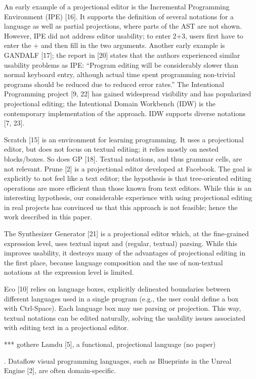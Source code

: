 An early example of a projectional editor is the Incremental Programming Environment (IPE) [16].
It supports the definition of several notations for a language as well as partial projections, where parts of the AST are not shown.
However, IPE did not address editor usability; to enter 2+3, users first have to enter the + and then fill in the two arguments.
Another early example is GANDALF [17]; the report in [20] states that the authors experienced similar usability problems as IPE: “Program editing will be considerably slower than normal keyboard entry, although actual time spent programming non-trivial programs should be reduced due to reduced error rates.”
The Intentional Programming project [9, 22] has gained widespread visibility and has popularized projectional editing; the Intentional Domain Workbench (IDW) is the contemporary implementation of the approach.
IDW supports diverse notations [7, 23].

Scratch [15] is an environment for learning programming.
It uses a projectional editor, but does not focus on textual editing; it relies mostly on nested blocks/boxes.
So does GP [18].
Textual notations, and thus grammar cells, are not relevant.
Prune [2] is a projectional editor developed at Facebook.
The goal is explicitly to not feel like a text editor; the hypothesis is that tree-oriented editing operations are more efficient than those known from text editors.
While this is an interesting hypothesis, our considerable experience with using projectional editing in real projects has convinced us that this approach is not feasible; hence the work described in this paper.

The Synthesizer Generator [21] is a projectional editor which, at the fine-grained expression level, uses textual input and (regular, textual) parsing.
While this improves usability, it destroys many of the advantages of projectional editing in the first place, because language composition and the use of non-textual notations at the expression level is limited.

Eco [10] relies on language boxes, explicitly delineated boundaries between different languages used in a single program (e.g., the user could define a box with Ctrl-Space).
Each language box may use parsing or projection.
This way, textual notations can be edited naturally, solving the usability issues associated with editing text in a projectional editor.

*** gothere
Lamdu [5], a functional, projectional language (no paper)

. Dataflow visual programming languages, such as Blueprints in the Unreal Engine [2], are often domain-specific.


